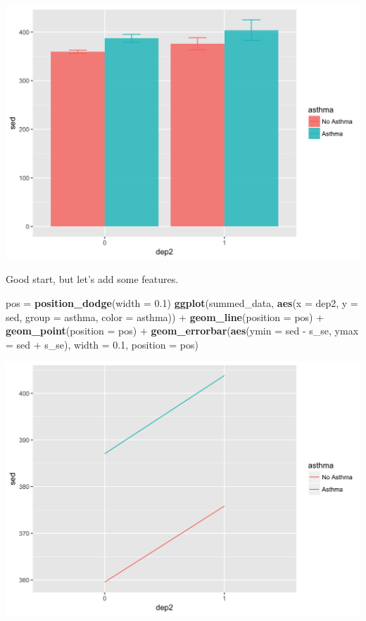 \documentclass[]{tufte-book}
\newenvironment{Shaded}{}{}
\newcommand{\KeywordTok}[1]{\textcolor[rgb]{0.00,0.44,0.13}{\textbf{#1}}}
\newcommand{\DataTypeTok}[1]{\textcolor[rgb]{0.56,0.13,0.00}{#1}}
\newcommand{\FloatTok}[1]{\textcolor[rgb]{0.25,0.63,0.44}{#1}}
\newcommand{\StringTok}[1]{\textcolor[rgb]{0.25,0.44,0.63}{#1}}
\newcommand{\OperatorTok}[1]{\textcolor[rgb]{0.40,0.40,0.40}{#1}}
\newcommand{\NormalTok}[1]{#1}
\theoremstyle{definition}
\theoremstyle{definition}
\theoremstyle{remark}
\begin{document}
\includegraphics{_main_files/figure-latex/unnamed-chunk-141-1}

Good start, but let's add some features.

\begin{Shaded}
\begin{Highlighting}[]
\NormalTok{pos =}\StringTok{ }\KeywordTok{position_dodge}\NormalTok{(}\DataTypeTok{width =} \FloatTok{0.1}\NormalTok{)}
\KeywordTok{ggplot}\NormalTok{(summed_data, }\KeywordTok{aes}\NormalTok{(}\DataTypeTok{x =}\NormalTok{ dep2, }\DataTypeTok{y =}\NormalTok{ sed, }\DataTypeTok{group =}\NormalTok{ asthma, }
    \DataTypeTok{color =}\NormalTok{ asthma)) }\OperatorTok{+}\StringTok{ }\KeywordTok{geom_line}\NormalTok{(}\DataTypeTok{position =}\NormalTok{ pos) }\OperatorTok{+}\StringTok{ }
\StringTok{    }\KeywordTok{geom_point}\NormalTok{(}\DataTypeTok{position =}\NormalTok{ pos) }\OperatorTok{+}\StringTok{ }\KeywordTok{geom_errorbar}\NormalTok{(}\KeywordTok{aes}\NormalTok{(}\DataTypeTok{ymin =}\NormalTok{ sed }\OperatorTok{-}\StringTok{ }
\StringTok{    }\NormalTok{s_se, }\DataTypeTok{ymax =}\NormalTok{ sed }\OperatorTok{+}\StringTok{ }\NormalTok{s_se), }\DataTypeTok{width =} \FloatTok{0.1}\NormalTok{, }\DataTypeTok{position =}\NormalTok{ pos)}
\end{Highlighting}
\end{Shaded}

\includegraphics{_main_files/figure-latex/unnamed-chunk-142-1}
\end{document}
